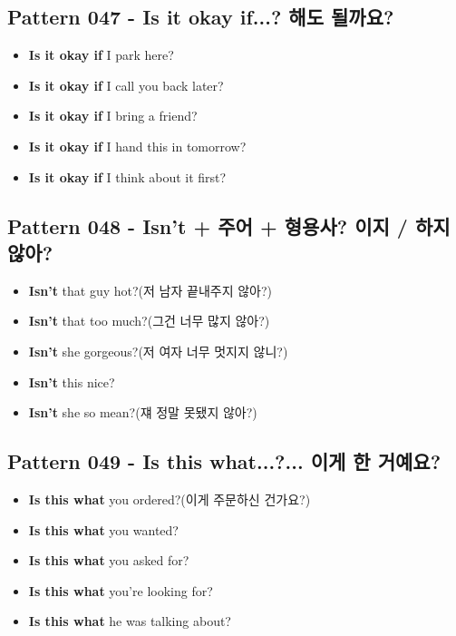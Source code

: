 \documentclass[11pt]{oblivoir}
\begin{document}
\subsection{Pattern 047 - Is it okay if...? \texttildelow 해도 될까요?}
\begin{itemize}
  \item \textbf{Is it okay if} I park here?
  \item \textbf{Is it okay if} I call you back later?
  \item \textbf{Is it okay if} I bring a friend?
  \item \textbf{Is it okay if} I hand this in tomorrow?
  \item \textbf{Is it okay if} I think about it first?
\end{itemize}

\subsection{Pattern 048 - Isn't + 주어 + 형용사? \texttildelow 이지 / \texttildelow 하지 않아?}
\begin{itemize}
  \item \textbf{Isn't} that guy hot?(저 남자 끝내주지 않아?)
  \item \textbf{Isn't} that too much?(그건 너무 많지 않아?)
  \item \textbf{Isn't} she gorgeous?(저 여자 너무 멋지지 않니?)
  \item \textbf{Isn't} this nice?
  \item \textbf{Isn't} she so mean?(쟤 정말 못됐지 않아?)
\end{itemize}

\subsection{Pattern 049 - Is this what...?... 이게 \texttildelow 한 거예요?}
\begin{itemize}
  \item \textbf{Is this what} you ordered?(이게 주문하신 건가요?)
  \item \textbf{Is this what} you wanted?
  \item \textbf{Is this what} you asked for?
  \item \textbf{Is this what} you're looking for?
  \item \textbf{Is this what} he was talking about?
\end{itemize}
\end{document}
